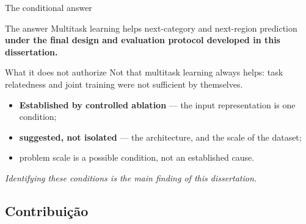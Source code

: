 \documentclass{beamer}
\begin{document}
\begin{frame}{The conditional answer}
    \begin{block}{The answer}
        \small
        Multitask learning helps next-category and next-region prediction \textbf{under the
        final design and evaluation protocol developed in this dissertation.}
    \end{block}

    \begin{alertblock}{What it does not authorize}
        \small
        Not that multitask learning always helps: task relatedness and joint training were
        \alert{not sufficient by themselves}.
    \end{alertblock}

    \medskip
    \begin{itemize}\setlength{\itemsep}{3pt}
        \item \textbf{Established by controlled ablation} --- the input representation is one
              condition;
        \item \textbf{suggested, not isolated} --- the architecture, and the scale of the dataset;
        \item \alert{problem scale is a possible condition, not an established cause}.
    \end{itemize}

    \vfill
    {\centering\small\textit{Identifying these conditions is the main finding of this
    dissertation.}\par}
\end{frame}

\subsection{Contribuição}
\end{document}
